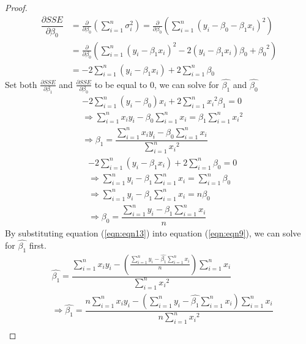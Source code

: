 \begin{answer}
\begin{proof}
    \begin{align}
        \dfrac{\partial SSE}{\partial \beta_0} & = \tfrac{\partial}{\partial \beta_0}{\left(\sum_{i = 1}^{n}{\sigma_{i}^2}\right)} = \tfrac{\partial}{\partial \beta_0}{\left(\sum_{i = 1}^{n}{(y_i - \beta_0 - \beta_1x_i)^2}\right)}\\ 
        & = \tfrac{\partial}{\partial \beta_0}{\left(\sum_{i = 1}^{n}{(y_i-\beta_1x_i)^2 - 2(y_i-\beta_1x_i)\beta_0 + {\beta_0}^2}\right)}\\
        & = -2\sum_{i = 1}^{n}{(y_i - \beta_1x_i)} + 2\sum_{i = 1}^{n}{\beta_0}
    \end{align}
    Set both $\tfrac{\partial SSE}{\partial \beta_1}$ and $\tfrac{\partial SSE}{\partial \beta_0}$ to be equal to $0$, we can solve for $\hat{\beta_1}$ and $\hat{\beta_0}$
    \begin{align}
        &-2\sum_{i = 1}^{n}{(y_i-\beta_0)x_i} + 2\sum_{i = 1}^{n}{x_i}^2\beta_1 = 0\\
        & \Rightarrow \sum_{i = 1}^{n}{x_iy_i} - \beta_0\sum_{i = 1}^{n}{x_i} = \beta_1\sum_{i = 1}^{n}{{x_i}^2}\\
        & \Rightarrow \beta_1 = \dfrac{\sum_{i = 1}^{n}{x_iy_i} - \beta_0\sum_{i = 1}^{n}{x_i}}{\sum_{i = 1}^{n}{{x_i}^2}}\label{eqn:eqn9}
    \end{align}
    \begin{align}
        &-2\sum_{i = 1}^{n}{(y_i - \beta_1x_i)} + 2\sum_{i = 1}^{n}{\beta_0} = 0\\
        & \Rightarrow \sum_{i = 1}^{n}{y_i} - \beta_1\sum_{i = 1}^{n}{x_i} = \sum_{i = 1}^{n}{\beta_0}\\
        & \Rightarrow \sum_{i = 1}^{n}{y_i} - \beta_1\sum_{i = 1}^{n}{x_i} = n\beta_0\\
        & \Rightarrow \beta_0 = \dfrac{\sum_{i = 1}^{n}{y_i} - \beta_1\sum_{i = 1}^{n}{x_i}}{n}\label{eqn:eqn13}
    \end{align}
    By substituting equation (\ref{eqn:eqn13}) into equation (\ref{eqn:eqn9}), we can solve for $\hat{\beta_1}$ first.
    \begin{align}
        &\hat{\beta_1} = \dfrac{\sum_{i = 1}^{n}{x_iy_i} - \left(\frac{\sum_{i = 1}^{n}{y_i} - \hat{\beta_1}\sum_{i = 1}^{n}{x_i}}{n}\right)\sum_{i = 1}^{n}{x_i}}{\sum_{i = 1}^{n}{{x_i}^2}}\\
        & \Rightarrow \hat{\beta_1} = \dfrac{n\sum_{i = 1}^{n}{x_iy_i} - \left(\sum_{i = 1}^{n}{y_i} - \hat{\beta_1}\sum_{i = 1}^{n}{x_i}\right)\sum_{i = 1}^{n}{x_i}}{n\sum_{i = 1}^{n}{{x_i}^2}}\\

\end{align}
\end{proof}
\end{answer}

